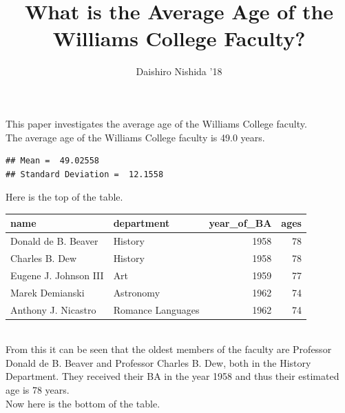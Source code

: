 \documentclass{article}\usepackage[]{graphicx}\usepackage[]{color}
\makeatletter
\newenvironment{kframe}{%
 \def\at@end@of@kframe{}%
 \ifinner\ifhmode%
  \def\at@end@of@kframe{\end{minipage}}%
  \begin{minipage}{\columnwidth}%
 \fi\fi%
 \def\FrameCommand##1{\hskip\@totalleftmargin \hskip-\fboxsep
 \colorbox{shadecolor}{##1}\hskip-\fboxsep
     \hskip-\linewidth \hskip-\@totalleftmargin \hskip\columnwidth}%
 \MakeFramed {\advance\hsize-\width
   \@totalleftmargin\z@ \linewidth\hsize
   \@setminipage}}%
 {\par\unskip\endMakeFramed%
 \at@end@of@kframe}
\newenvironment{knitrout}{}{} %
\makeatother
\begin{document}
\title{What is the Average Age of the Williams College Faculty?}
\author{Daishiro Nishida '18}
\maketitle

This paper investigates the average age of the Williams College faculty.\\

The average age of the Williams College faculty is 49.0 years.

\begin{knitrout}
\color{fgcolor}\begin{kframe}
\begin{verbatim}
## Mean =  49.02558 
## Standard Deviation =  12.1558
\end{verbatim}
\end{kframe}
\end{knitrout}

Here is the top of the table.\\

\begin{knitrout}
\color{fgcolor}
\begin{tabular}{l|l|r|r}
\hline
name & department & year\_of\_BA & ages\\
\hline
Donald de B. Beaver & History & 1958 & 78\\
\hline
Charles B. Dew & History & 1958 & 78\\
\hline
Eugene J. Johnson III & Art & 1959 & 77\\
\hline
Marek Demianski & Astronomy & 1962 & 74\\
\hline
Anthony J. Nicastro & Romance Languages & 1962 & 74\\
\hline
\end{tabular}


\end{knitrout}
\hfill
\\
From this it can be seen that the oldest members of the faculty are Professor Donald de B. Beaver and Professor Charles B. Dew, both in the History Department. They received their BA in the year 1958 and thus their estimated age is 78 years.\\

Now here is the bottom of the table.\\
\end{document}
